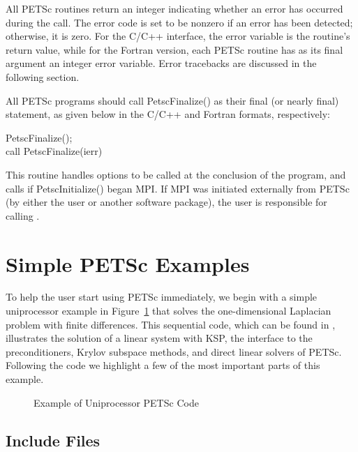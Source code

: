 All PETSc routines return an integer indicating whether an error has
occurred during the call.  The error code is set to be nonzero if an
error has been detected; otherwise, it is zero.  For the C/C++
interface, the error variable is the routine's return value, while for
the Fortran version, each PETSc routine has as its final argument an
integer error variable.  Error tracebacks are discussed in the following
section.

All PETSc programs should call PetscFinalize()
as their final (or nearly final) statement, as given below in the C/C++
and Fortran formats, respectively:
\begin{tabbing}
  PetscFinalize();\\
  call PetscFinalize(ierr)
\end{tabbing}
This routine handles options to be called at the conclusion of
the program, and calls  
if PetscInitialize()
began MPI. If MPI was initiated externally from PETSc (by either
the user or another software package), the user is
responsible for calling . 

\section{Simple PETSc Examples}

\label{sec_simple}

To help the user start using PETSc immediately, we begin with a simple
uniprocessor example in Figure~\ref{fig_example1} that solves the
one-dimensional Laplacian problem with finite differences.  This
sequential code, which can be found in 
,
illustrates the solution of a linear system with KSP, the 
interface to the preconditioners, Krylov subspace methods, and direct
linear solvers of PETSc.  Following the code we highlight a few of the most important
parts of this example.  

\begin{figure}[H]
{\footnotesize
{}
}
\caption{Example of Uniprocessor PETSc Code}
\label{fig_example1}
\end{figure}

\subsection*{Include Files}

